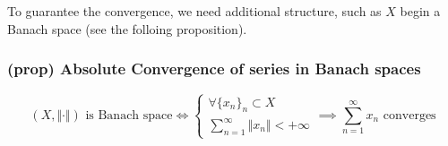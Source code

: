 To guarantee the convergence, we need additional structure, such as $X$ begin a Banach space (see the folloing proposition).
\subsubsection{(prop) Absolute Convergence of series in Banach spaces}
$$(X,\Vert\cdot\Vert) \text{ is Banach space}\iff \begin{cases}\forall \{x_n\}_n\subset X\\ \sum_{n=1}^\infty \Vert x_n\Vert <+\infty\end{cases}\implies \sum_{n=1}^\infty x_n \text{ converges}$$